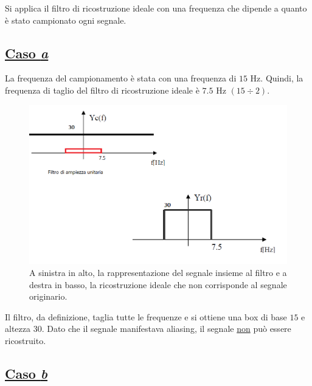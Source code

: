 \documentclass[a4paper]{article}
\begin{document}
	Si applica il filtro di ricostruzione ideale con una frequenza che dipende a quanto è stato campionato ogni segnale.
	
	\subsection*{\textcolor{Green4}{\underline{Caso \emph{a}}}}
	
	La frequenza del campionamento è stata con una frequenza di $15$ Hz. Quindi, la frequenza di taglio del filtro di ricostruzione ideale è $7.5$ Hz $\left(15 \div 2\right)$.
	\begin{figure}[!htp]
		\centering
		\includegraphics[width=\textwidth]{img/fig_9.png}
		\caption*{A sinistra in alto, la rappresentazione del segnale insieme al filtro e a destra in basso, la ricostruzione ideale che non corrisponde al segnale originario.}
	\end{figure}
	
	\noindent
	Il filtro, da definizione, taglia tutte le frequenze e si ottiene una box di base $15$ e altezza $30$. Dato che il segnale manifestava aliasing, il segnale \underline{non} può essere ricostruito.\newpage
	
	\subsection*{\textcolor{Green4}{\underline{Caso \emph{b}}}}
	
\end{document}
